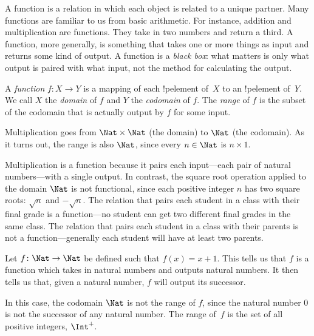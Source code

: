 \documentclass[../../include/open-logic-section]{subfiles}
\begin{document}

\begin{explain}
A function is a relation in which each object is related to a unique partner. Many functions are familiar to us from basic arithmetic. For instance, addition and multiplication are functions. They take in two numbers and return a third. A function, more generally, is something that takes one or more things as input and returns some kind of output. A function is a \emph{black box}: what matters is only what output is paired with what input, not the method for calculating the output. 
\end{explain}

\begin{defn}
A \emph{function} $f \colon X \to Y$ is a mapping of each !p{element}
of~$X$ to an !p{element} of~$Y$. We call $X$ the \emph{domain} of $f$
and $Y$ the \emph{codomain} of $f$. The \emph{range} of $f$ is the
subset of the codomain that is actually output by $f$ for some input.
\end{defn}

\begin{ex}
Multiplication goes from $\Nat \times \Nat$ (the domain) to $\Nat$ (the codomain). As it turns out, the range is also $\Nat$, since every $n \in \Nat$ is $n \times 1$.
\end{ex}

\begin{explain}
Multiplication is a function because it pairs each input---each pair of natural numbers---with a single output. In contrast, the square root operation applied to the domain $\Nat$ is not functional, since each positive integer $n$ has two square roots: $\sqrt{n}$ and $-\sqrt{n}$. The relation that pairs each student in a class with their final grade is a function---no student can get two different final grades in the same class. The relation that pairs each student in a class with their parents is not a function---generally each student will have at least two parents.
\end{explain}

\begin{ex}
Let $f \colon \Nat \to \Nat$ be defined such that $f(x) = x+1$. This tells us that $f$ is a function which takes in natural numbers and outputs natural numbers. It then tells us that, given a natural number, $f$ will output its successor.
\end{ex}

\begin{explain}
In this case, the codomain $\Nat$ is not the range of $f$, since the natural number $0$ is not the successor of any natural number. The range of~$f$ is the set of all positive integers, $\Int^{+}$.
\end{explain}
\end{document}
